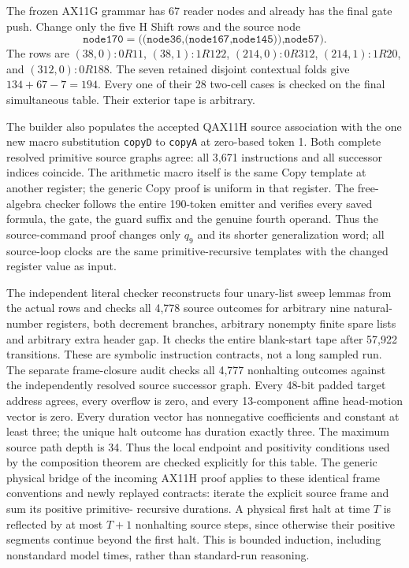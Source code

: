 The frozen AX11G grammar has 67 reader nodes and already has the final
gate push.  Change only the five H Shift rows and the source node
\[
 \texttt{node170}=\texttt{((node36,(node167,node145)),node57)}.
\]
The rows are $(38,0):0R11$, $(38,1):1R122$,
$(214,0):0R312$, $(214,1):1R20$, and $(312,0):0R188$.
The seven retained disjoint contextual folds give $134+67-7=194$.
Every one of their 28 two-cell cases is checked on the final simultaneous
table.  Their exterior tape is arbitrary.

The builder also populates the accepted QAX11H source association with
the one new macro substitution \texttt{copyD} to \texttt{copyA} at
zero-based token 1.  Both complete resolved primitive source graphs
agree: all 3,671 instructions and all successor indices coincide.
The arithmetic macro itself is the same Copy template at another
register; the generic Copy proof is uniform in that register.
The free-algebra checker follows the entire 190-token emitter and verifies
every saved formula, the gate, the guard suffix and the genuine fourth
operand.  Thus the source-command proof changes only $q_9$ and its
shorter generalization word; all source-loop clocks are the same
primitive-recursive templates with the changed register value as input.

The independent literal checker reconstructs four unary-list sweep
lemmas from the actual rows and checks all 4,778 source outcomes for
arbitrary nine natural-number registers, both decrement branches,
arbitrary nonempty finite spare lists and arbitrary extra header gap.
It checks the entire blank-start tape after 57,922 transitions.
These are symbolic instruction contracts, not a long sampled run.
The separate frame-closure audit checks all 4,777 nonhalting outcomes
against the independently resolved source successor graph.  Every
48-bit padded target address agrees, every overflow is zero, and every
13-component affine head-motion vector is zero.  Every duration vector
has nonnegative coefficients and constant at least three; the unique
halt outcome has duration exactly three.  The maximum source path
depth is 34.  Thus the local endpoint and positivity conditions used
by the composition theorem are checked explicitly for this table.
The generic physical bridge of the incoming AX11H proof applies to
these identical frame conventions and newly replayed contracts:
iterate the explicit source frame and sum its positive primitive-
recursive durations.  A physical first halt at time $T$ is reflected
by at most $T+1$ nonhalting source steps, since otherwise their positive
segments continue beyond the first halt.  This is bounded induction,
including nonstandard model times, rather than standard-run reasoning.


